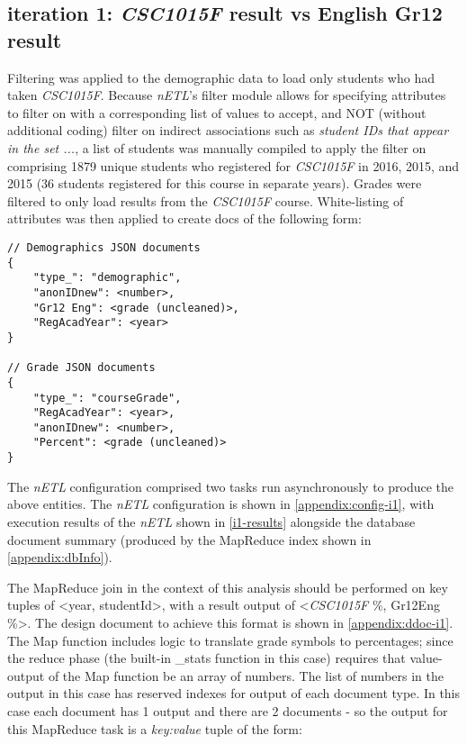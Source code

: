 \subsection{iteration 1: \textit{CSC1015F} result vs English Gr12 result}
Filtering was applied to the demographic data to load only students who had taken \textit{CSC1015F}. Because \textit{nETL}'s filter module allows for specifying attributes to filter on with a corresponding list of values to accept, and NOT (without additional coding) filter on indirect associations such as \textit{student IDs that appear in the set ...}, a list of students was manually compiled to apply the filter on comprising 1879 unique students who registered for \textit{CSC1015F} in 2016, 2015, and 2015 (36 students registered for this course in separate years). Grades were filtered to only load results from the \textit{CSC1015F} course. White-listing of attributes was then applied to create docs of the following form:

\begin{verbatim}
// Demographics JSON documents
{
    "type_": "demographic",
    "anonIDnew": <number>,
    "Gr12 Eng": <grade (uncleaned)>,
    "RegAcadYear": <year>
}

// Grade JSON documents
{
    "type_": "courseGrade",
    "RegAcadYear": <year>,
    "anonIDnew": <number>,
    "Percent": <grade (uncleaned)>
}
\end{verbatim}

The \textit{nETL} configuration comprised two tasks run asynchronously to produce the above entities. The \textit{nETL} configuration is shown in \ref{appendix:config-i1}, with execution results of the \textit{nETL} shown in \ref{i1-results} alongside the database document summary (produced by the MapReduce index shown in \ref{appendix:dbInfo}).



The MapReduce join in the context of this analysis should be performed on key tuples of <year, studentId>, with a result output of <\textit{CSC1015F} \%, Gr12Eng \%>. The design document to achieve this format is shown in \ref{appendix:ddoc-i1}. The Map function includes logic to translate grade symbols to percentages; since the reduce phase (the built-in \_stats function in this case) requires that value-output of the Map function be an array of numbers. The list of numbers in the output in this case has reserved indexes for output of each document type. In this case each document has 1 output and there are 2 documents - so the output for this MapReduce task is a \textit{key:value} tuple of the form:

